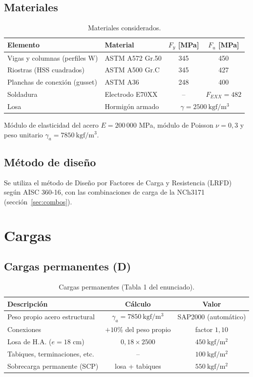 \documentclass[11pt,letterpaper]{article}
\begin{document}
\subsection{Materiales}
\begin{table}[H]
\centering
\caption{Materiales considerados.}
\begin{tabular}{llcc}
\toprule
Elemento & Material & $F_y$ [MPa] & $F_u$ [MPa] \\
\midrule
Vigas y columnas (perfiles W) & ASTM A572 Gr.50 & 345 & 450 \\
Riostras (HSS cuadrados) & ASTM A500 Gr.C & 345 & 427 \\
Planchas de conexión (gusset) & ASTM A36 & 248 & 400 \\
Soldadura & Electrodo E70XX & -- & $F_{EXX} = 482$ \\
Losa & Hormigón armado & \multicolumn{2}{c}{$\gamma = 2500\ \mathrm{kgf/m^3}$} \\
\bottomrule
\end{tabular}
\end{table}
Módulo de elasticidad del acero $E = 200\,000$ MPa, módulo de Poisson $\nu = 0{,}3$ y
peso unitario $\gamma_a = 7850\ \mathrm{kgf/m^3}$.

\subsection{Método de diseño}
Se utiliza el método de Diseño por Factores de Carga y Resistencia (LRFD) según AISC 360-16, con las
combinaciones de carga de la NCh3171 (sección~\ref{sec:combos}).

\section{Cargas}

\subsection{Cargas permanentes (D)}
\begin{table}[H]
\centering
\caption{Cargas permanentes (Tabla 1 del enunciado).}
\begin{tabular}{lcc}
\toprule
Descripción & Cálculo & Valor \\
\midrule
Peso propio acero estructural & $\gamma_a = 7850\ \mathrm{kgf/m^3}$ & SAP2000 (automático) \\
Conexiones & $+10\%$ del peso propio & factor $1{,}10$ \\
Losa de H.A. ($e = 18$ cm) & $0{,}18 \times 2500$ & $450\ \mathrm{kgf/m^2}$ \\
Tabiques, terminaciones, etc. & -- & $100\ \mathrm{kgf/m^2}$ \\
\midrule
Sobrecarga permanente (SCP) & losa + tabiques & $550\ \mathrm{kgf/m^2}$ \\
\bottomrule
\end{tabular}
\end{table}
\end{document}

